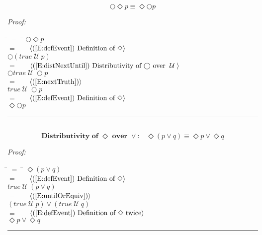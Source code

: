 \documentclass[fleqn, leqno]{article}
\newcommand{\lgap}{2pt}                             %
\newcommand{\mymathindent}{24pt}                    %
\newcommand{\Until}{\;\mathcal{U}\;}
\newcommand{\Next}{\bigcirc}
\newcommand{\Event}{\Diamond}
\newcommand{\myqed}{\hfill\rule[-.23ex]{1.2ex}{2.0ex}}
\newcommand{\Gll} {\langle}                         %
\newcommand{\Ggg} {\rangle}                         %
\newcommand{\Hint}[1]     {\ \ \ $\Gll              \mbox{#1} \Ggg$ }   %
\begin{document}
\begin{equation}\label{E:dNextEvent}
\Next\Event p \equiv \Event\Next p
\end{equation}

\emph{Proof:}
\begin{tabbing}
\hspace{\mymathindent} \= $= \;$ \= \kill
  \> \>   $\Next\Event p$\\[\lgap]
  \> $=$  \>  \Hint{(\ref{E:defEvent}) Definition of $\Event$}\\[\lgap]
  \> \>   $\Next(true \Until p)$\\[\lgap]
  \> $=$  \>  \Hint{(\ref{E:distNextUntil}) Distributivity of $\Next$ over $\Until$}\\[\lgap]
  \> \>   $\Next true \Until \Next p$\\[\lgap]
  \> $=$  \>  \Hint{(\ref{E:nextTruth})}\\[\lgap]
  \> \>   $true \Until \Next p$\\[\lgap]
  \> $=$  \>  \Hint{(\ref{E:defEvent}) Definition of $\Event$}\\[\lgap]
  \> \>   $\Event\Next p$\\[\lgap]
\end{tabbing}
\myqed\\[\lgap]


\begin{equation}\label{E:distEventOr}
\textbf{Distributivity of $\Event$ over $\lor$:}\quad \Event(p \lor q) \equiv \Event p \lor \Event q
\end{equation}

\emph{Proof:}
\begin{tabbing}
\hspace{\mymathindent} \= $= \;$ \= \kill
  \> \>   $\Event(p \lor q)$\\[\lgap]
  \> $=$  \>  \Hint{(\ref{E:defEvent}) Definition of $\Event$}\\[\lgap]
  \> \>   $true \Until (p \lor q)$\\[\lgap]
  \> $=$  \>  \Hint{(\ref{E:untilOrEquiv})}\\[\lgap]
  \> \>   $(true \Until p) \lor (true \Until q)$\\[\lgap]
  \> $=$  \>  \Hint{(\ref{E:defEvent}) Definition of $\Event$ twice}\\[\lgap]
  \> \>   $\Event p \lor \Event q$\\[\lgap]
\end{tabbing}
\myqed\\[\lgap]
\end{document}
